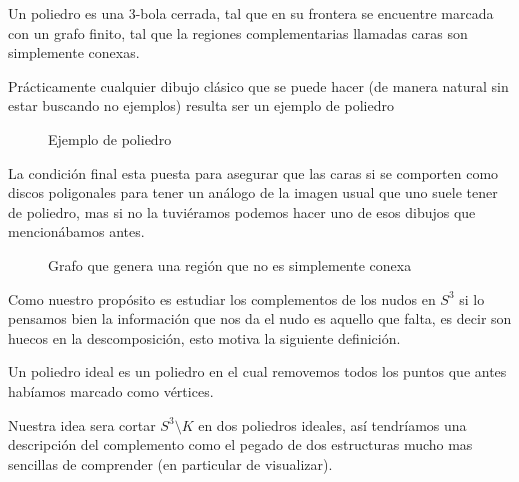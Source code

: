


\begin{definition}
    Un poliedro es una 3-bola cerrada, tal que en su frontera se encuentre marcada con un grafo finito, tal que la regiones complementarias llamadas caras son simplemente conexas.
\end{definition}
Prácticamente cualquier dibujo clásico que se puede hacer (de manera natural sin estar buscando no ejemplos) resulta ser un ejemplo de poliedro
\begin{figure}[H]
    \centering
    
    \caption{Ejemplo de poliedro}
\end{figure}
La condición final esta puesta para asegurar que las caras si se comporten como discos poligonales para tener un análogo de la imagen usual que uno suele tener de poliedro, mas si no la tuviéramos podemos hacer uno de esos dibujos que mencionábamos antes.
\begin{figure}[H]
    \centering
    
    \caption{Grafo que genera una región que no es simplemente conexa}
\end{figure}
Como nuestro propósito es estudiar los complementos de los nudos en $S^3$ si lo pensamos bien la información que nos da el nudo es aquello que falta, es decir son huecos en la descomposición, esto motiva la siguiente definición. 
\begin{definition}
    Un poliedro ideal es un poliedro en el cual removemos todos los puntos que antes habíamos marcado como vértices.
\end{definition}

Nuestra idea sera cortar $S^3\setminus K$ en dos poliedros ideales, así tendríamos  una descripción del complemento como el pegado de dos estructuras mucho mas sencillas de comprender (en particular de visualizar).\\

